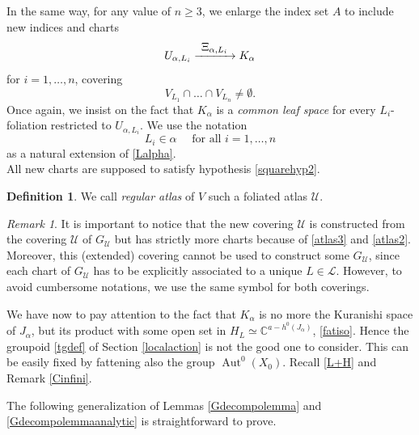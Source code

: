 \documentclass[10pt]{amsart}
\let\mathcal\mathscr
\def\To#1{\mathchoice{\xrightarrow{\textstyle\kern4pt#1\kern3pt}}{\stackrel{#1}{\longrightarrow}}{}{}}
\DeclareMathOperator{\Aut}{Aut}
\theoremstyle{plain}
\theoremstyle{definition}
\newtheorem{definition}[theorem]{Definition}
\theoremstyle{remark}
\newtheorem{remark}[theorem]{Remark}
\numberwithin{equation}{section}
\newcommand{\CC}{{\mathbb{C}}}
\newcommand{\Azero}{\Aut^0(X_0)}
\begin{document}
In the same way, for any value of $n\geq 3$, we enlarge the index set $A$ to include new indices and charts
\begin{equation}
\label{atlas3}
U_{\alpha, L_i}\To{\Xi_{\alpha, L_i}}K_{\alpha}
\end{equation}
for $i=1,\hdots, n$, covering
\begin{equation}
\label{inter2}
V_{L_1}\cap\hdots\cap V_{L_n}\not =\emptyset.
\end{equation}
Once again, we insist on the fact that $K_{\alpha}$ is a \emph{common leaf space} for every $L_i$-foliation restricted to $U_{\alpha,L_i}$.
We use the notation
\begin{equation}
\label{Lialpha}
L_i\in\alpha\quad\text{ for all } i=1,\hdots, n
\end{equation}
as a natural extension of \eqref{Lalpha}.
\medskip\\
All new charts are supposed to satisfy hypothesis \ref{squarehyp2}.

\begin{definition}
\label{regatlasdef}
We call \emph{regular atlas} of $V$ such a foliated atlas $\mathcal U$.
\end{definition}

\begin{remark}
\label{atlases}
It is important to notice that the new covering $\mathcal U$ is constructed from the covering $\mathcal U$ of $G_{\mathcal U}$ but has strictly more charts because of \eqref{atlas3} and \eqref{atlas2}. Moreover, this (extended) covering cannot be used to construct some $G_{\mathcal U}$, since each chart of $G_{\mathcal U}$ has to be explicitly associated to a unique $L\in\mathcal L$. However, to avoid cumbersome notations, we use the same symbol for both coverings.
\end{remark}

We have now to pay attention to the fact that $K_\alpha$ is no more the Kuranishi space of $J_\alpha$, but its product with some open set in $H_L\simeq\CC^{a-h^0(J_\alpha)}$, \cf \eqref{fatiso}. Hence the groupoid \eqref{tgdef} of Section \ref{localaction} is not the good one to consider. This can be easily fixed by fattening also the group $\Azero$. Recall \eqref{L+H} and Remark \ref{Cinfini}.

The following generalization of Lemmas \ref{Gdecompolemma} and \ref{Gdecompolemmaanalytic} is straightforward to prove.
\end{document}
